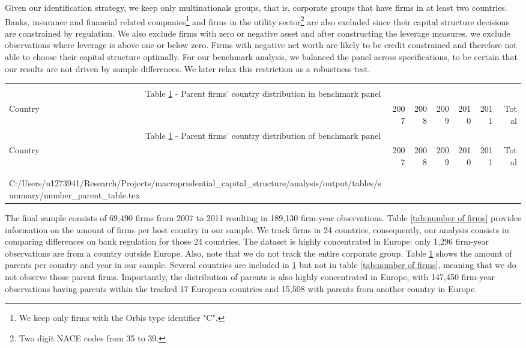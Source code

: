 \documentclass[12pt]{article}
\makeatletter
\newcommand\primitiveinput[1]
{\@@input #1 }
\makeatother
\begin{document}
	Given our identification strategy, we keep only multinationals groups, that is, corporate groups that have firms in at least two countries.  Banks, insurance and financial related companies\footnote{We keep only firms with the Orbis type identifier "C".} and firms in the utility sector\footnote{Two digit NACE codes from 35 to 39.} are also excluded since their capital structure decisions are constrained by regulation. We also exclude firms with zero or negative asset and after constructing the leverage measures, we exclude observations where leverage is above one or below zero. Firms with negative net worth are likely to be credit constrained and therefore not able to choose their capital structure optimally. For our benchmark analysis, we balanced the panel across specifications, to be certain that our results are not driven by sample differences. We later relax this restriction as a robustness test.
	
		\begin{small}
		{
			\begin{longtable}{lrrrrrr}\\
				\label{tab:number of parent}\\
				\multicolumn{7}{c}{Table \ref{tab:number of parent} - Parent firms' country distribution in benchmark panel}\\
				\hline \hline \addlinespace Country & 2007 & 2008 & 2009 & 2010 & 2011 & Total  \\
				\endfirsthead
				\multicolumn{7}{c}{Table \ref{tab:number of parent} - Parent firms' country distribution of benchmark panel}\\
				\hline \hline \addlinespace Country & 2007 & 2008 & 2009 & 2010 & 2011 & Total  \\
				\hline \addlinespace \endhead
				\hline
				\multicolumn{7}{r}{{\textit{(Continued)}}}\\ \endfoot
				\\ 	
				\endlastfoot
				\primitiveinput{C:/Users/u1273941/Research/Projects/macroprudential_capital_structure/analysis/output/tables/summary/number_parent_table.tex}
				\hline 			
			\end{longtable}	
		}
	\end{small}

	The final sample consists of 69,490 firms from 2007 to 2011 resulting in 189,130 firm-year observations. Table \ref{tab:number of firms} provides information on the amount of firms per host country in our sample. We track firms in 24 countries, consequently, our analysis consists in comparing differences on bank regulation for those 24 countries. The dataset is highly concentrated in Europe: only 1,296 firm-year observations are from a country outside Europe. Also, note that we do not track the entire corporate group. Table \ref{tab:number of parent} shows the amount of parents per country and year in our sample. Several countries are included in \ref{tab:number of parent} but not in table \ref{tab:number of firms}, meaning that we do not observe those parent firms. Importantly, the distribution of parents is also highly concentrated in Europe, with 147,450 firm-year observations having parents within the tracked 17 European countries and 15,508 with parents from another country in Europe.
	
\end{document}

